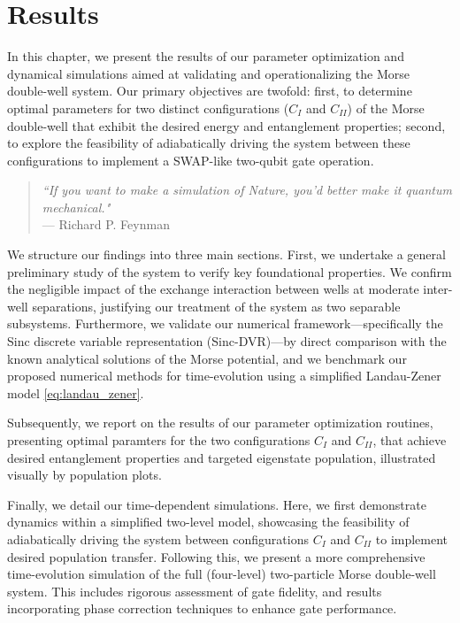 \documentclass{subfiles}
\begin{document}
\chapter{Results}\label{chap:4}
In this chapter, we present the results of our parameter optimization and dynamical simulations aimed at validating and operationalizing the Morse double-well system. Our primary objectives are twofold: first, to determine optimal parameters for two distinct configurations ($C_I$ and $C_{II}$) of the Morse double-well that exhibit the desired energy and entanglement properties; second, to explore the feasibility of adiabatically driving the system between these configurations to implement a SWAP-like two-qubit gate operation.

\begin{quote}
    \centering
    \textit{“If you want to make a simulation of Nature, you'd better make it quantum mechanical."}\\
    \vspace{0.2cm}
    --- Richard P. Feynman    
\end{quote}



We structure our findings into three main sections. First, we undertake a general preliminary study of the system to verify key foundational properties. We confirm the negligible impact of the exchange interaction between wells at moderate inter-well separations, justifying our treatment of the system as two separable subsystems. Furthermore, we validate our numerical framework—specifically the Sinc discrete variable representation (Sinc-DVR)—by direct comparison with the known analytical solutions of the Morse potential, and we benchmark our proposed numerical methods for time-evolution using a simplified Landau-Zener model \eqref{eq:landau_zener}.

Subsequently, we report on the results of our parameter optimization routines, presenting optimal paramters for the two configurations $C_I$ and $C_{II}$, that achieve desired entanglement properties and targeted eigenstate population, illustrated visually by population plots.

Finally, we detail our time-dependent simulations. Here, we first demonstrate dynamics within a simplified two-level model, showcasing the feasibility of adiabatically driving the system between configurations $C_I$ and $C_{II}$ to implement desired population transfer. Following this, we present a more comprehensive time-evolution simulation of the full (four-level) two-particle Morse double-well system. This includes rigorous assessment of gate fidelity, and results incorporating phase correction techniques to enhance gate performance.

\newpage



\end{document}

